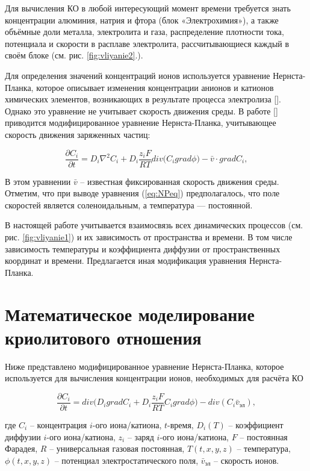 \documentclass[pdflatex,sn-mathphys-gost]{pmi-jnl}
\begin{document}
Для вычисления КО в любой интересующий момент времени требуется знать концентрации алюминия, натрия и фтора (блок «Электрохимия»), а также объёмные доли металла, электролита и газа, распределение плотности тока, потенциала и скорости в расплаве электролита, рассчитывающиеся каждый в своём блоке (см. рис. \ref{fig:vliyanie2}.). 

Для определения значений концентраций ионов используется уравнение Нернста-Планка, которое описывает изменения концентрации анионов и катионов химических элементов, возникающих в результате процесса электролиза [\cite{litlink:burger}]. Однако это уравнение не учитывает скорость движения среды. В работе [\cite{litlink:damaskin}] приводится модифицированное уравнение Нернста-Планка, учитывающее скорость движения заряженных частиц:

\begin{equation}\label{eq:NPeq}
	\frac{\partial C_i}{\partial t} = D_i\nabla^{2}C_i+D_i\frac{z_iF}{RT}div\big(C_i grad\phi\big) - \bar{v} \cdot gradC_i,
\end{equation}

В этом уравнении $\bar{v}$ – известная фиксированная скорость движения среды. Отметим, что при выводе уравнения (\ref{eq:NPeq}) предполагалось, что поле скоростей является соленоидальным, а температура --- постоянной. 

В настоящей работе учитывается взаимосвязь всех динамических процессов (см. рис. \ref{fig:vliyanie1}) и их зависимость от пространства и времени. В том числе зависимость температуры и коэффициента диффузии от пространственных координат и времени. Предлагается иная модификация уравнения Нернста-Планка. 

\section{Математическое моделирование криолитового отношения}

Ниже представлено модифицированное уравнение Нернста-Планка, которое используется для вычисления концентрации ионов, необходимых для расчёта КО

\begin{equation}\label{eq:NPeqmod}
	\frac{\partial C_i}{\partial t} = div\bigg(D_i gradC_i + D_i \frac{z_iF}{RT}C_igrad\phi\bigg) - div(C_i \bar{v}_{\text{эл}}),
\end{equation}

где $C_i$ – концентрация $i$-ого иона/катиона, $t$-время, $D_i (T)$ – коэффициент диффузии $i$-ого иона/катиона, $z_i$ – заряд $i$-ого иона/катиона, $F$ – постоянная Фарадея, $R$ – универсальная газовая постоянная, $T(t,x,y,z)$ – температура, $\phi (t,x,y,z)$ – потенциал электростатического поля, $\bar{v}_\text{эл}$ – скорость ионов.
\end{document}
